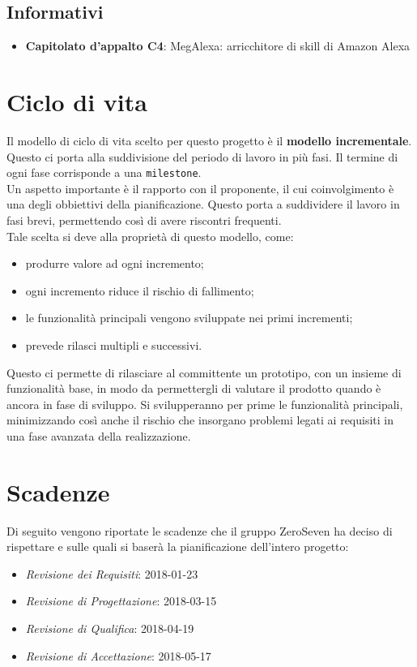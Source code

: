 \subsection{Informativi}
\begin{itemize}
	\item \textbf{Capitolato d'appalto C4}: MegAlexa: arricchitore di skill di Amazon Alexa
\end{itemize}
\section{Ciclo di vita}
Il modello di ciclo di vita scelto per questo progetto è il \textbf{modello incrementale}. Questo ci porta alla suddivisione del periodo di lavoro in più fasi. Il termine di ogni fase corrisponde a una \texttt{milestone}.\\
Un aspetto importante è il rapporto con il proponente, il cui coinvolgimento è una degli obbiettivi della pianificazione. Questo porta a suddividere il lavoro in fasi brevi, permettendo così di avere riscontri frequenti.\\
Tale scelta si deve alla proprietà di questo modello, come:
\begin{itemize}
	\item produrre valore ad ogni incremento;
	\item ogni incremento riduce il rischio di fallimento;
	\item le funzionalità principali vengono sviluppate nei primi incrementi;
	\item prevede rilasci multipli e successivi.
\end{itemize}
Questo ci permette di rilasciare al committente un prototipo, con un insieme di funzionalità base, in modo da permettergli di valutare il prodotto quando è ancora in fase di sviluppo. Si svilupperanno per prime le funzionalità principali, minimizzando così anche il rischio che insorgano problemi legati ai requisiti in una fase avanzata della realizzazione.


\section{Scadenze}
Di seguito vengono riportate le scadenze che il gruppo ZeroSeven ha deciso di rispettare e sulle quali si baserà la pianificazione dell'intero progetto:
\begin{itemize}
	\item \textit{Revisione dei Requisiti}: 2018-01-23
	\item \textit{Revisione di Progettazione}: 2018-03-15
	\item \textit{Revisione di Qualifica}: 2018-04-19
	\item \textit{Revisione di Accettazione}: 2018-05-17
\end{itemize}